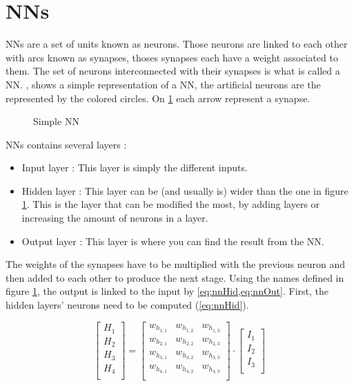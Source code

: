 \section{\aclp{NN}}\label{sec:nn}

\acfp{NN} are a set of units known as neurons. Those neurons are linked to each other with arcs known as synapses, thoses synapses each have a weight associated to them. The set of neurons interconnected with their synapses is what is called a \acl{NN}.
, shows a simple representation of a \ac{NN}, the artificial neurons are the represented by the colored circles. On \cref{fig:snn} each arrow represent a synapse.

\begin{figure}[h!]
  \centering
  
  \caption{Simple \acl{NN}}
  \label{fig:snn}
\end{figure}

\acp{NN} contains several layers :

\begin{itemize}
  \item Input layer : This layer is simply the different inputs.
  \item Hidden layer : This layer can be (and usually is) wider than the one in figure \ref{fig:snn}. This is the layer that can be modified the most, by adding layers or increasing the amount of neurons in a layer.
  \item Output layer : This layer is where you can find the result from the \ac{NN}.
\end{itemize}

The weights of the synapses have to be multiplied with the previous neuron and then added to each other to produce the next stage. Using the names defined in figure \ref{fig:snn}, the output is linked to the input by \cref{eq:nnHid,eq:nnOut}. First, the hidden layers' neurons need to be computed (\cref{eq:nnHid}).

\begin{equation}\label{eq:nnHid}
  \begin{bmatrix}
    H_1\\ H_2\\ H_3\\ H_4\\
  \end{bmatrix}
  =
  \begin{bmatrix}
    w_h_{1,1} & w_h_{1,2} & w_h_{1,3}\\
    w_h_{2,1} & w_h_{2,2} & w_h_{2,3}\\
    w_h_{3,1} & w_h_{3,2} & w_h_{3,3}\\
    w_h_{4,1} & w_h_{4,2} & w_h_{4,3}\\
  \end{bmatrix}
  \cdot
  \begin{bmatrix}
    I_1\\ I_2\\ I_3\\
  \end{bmatrix}
\end{equation}

